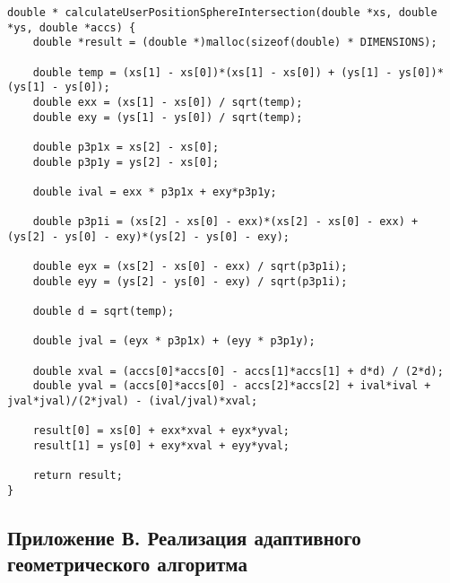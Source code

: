 \begin{lstlisting}
double * calculateUserPositionSphereIntersection(double *xs, double *ys, double *accs) {
    double *result = (double *)malloc(sizeof(double) * DIMENSIONS);

    double temp = (xs[1] - xs[0])*(xs[1] - xs[0]) + (ys[1] - ys[0])*(ys[1] - ys[0]);
    double exx = (xs[1] - xs[0]) / sqrt(temp);
    double exy = (ys[1] - ys[0]) / sqrt(temp);
    
    double p3p1x = xs[2] - xs[0];
    double p3p1y = ys[2] - xs[0];
    
    double ival = exx * p3p1x + exy*p3p1y;
    
    double p3p1i = (xs[2] - xs[0] - exx)*(xs[2] - xs[0] - exx) + (ys[2] - ys[0] - exy)*(ys[2] - ys[0] - exy);
    
    double eyx = (xs[2] - xs[0] - exx) / sqrt(p3p1i);
    double eyy = (ys[2] - ys[0] - exy) / sqrt(p3p1i);
    
    double d = sqrt(temp);
    
    double jval = (eyx * p3p1x) + (eyy * p3p1y);
    
    double xval = (accs[0]*accs[0] - accs[1]*accs[1] + d*d) / (2*d);
    double yval = (accs[0]*accs[0] - accs[2]*accs[2] + ival*ival + jval*jval)/(2*jval) - (ival/jval)*xval;
    
    result[0] = xs[0] + exx*xval + eyx*yval;
    result[1] = ys[0] + exy*xval + eyy*yval;
    
    return result;
}
\end{lstlisting}

\clearpage \newpage
\subsection*{Приложение В. Реализация адаптивного геометрического алгоритма}


